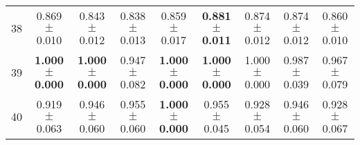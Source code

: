 \begin{table}[!ht]
{\begin{tabular}{r c c c c c c c c}
38 & 0.869 $\pm$ 0.010 & 0.843 $\pm$ 0.012 & 0.838 $\pm$ 0.013 & 0.859 $\pm$ 0.017 & \textbf{0.881 $\pm$ 0.011} & 0.874 $\pm$ 0.012 & 0.874 $\pm$ 0.012 & 0.860 $\pm$ 0.010 \\
39 & \textbf{1.000 $\pm$ 0.000} & \textbf{1.000 $\pm$ 0.000} & 0.947 $\pm$ 0.082 & \textbf{1.000 $\pm$ 0.000} & \textbf{1.000 $\pm$ 0.000} & 1.000 $\pm$ 0.000 & 0.987 $\pm$ 0.039 & 0.967 $\pm$ 0.079 \\
40 & 0.919 $\pm$ 0.063 & 0.946 $\pm$ 0.060 & 0.955 $\pm$ 0.060 & \textbf{1.000 $\pm$ 0.000} & 0.955 $\pm$ 0.045 & 0.928 $\pm$ 0.054 & 0.946 $\pm$ 0.060 & 0.928 $\pm$ 0.067 \\
\end{tabular}}
\end{table}
